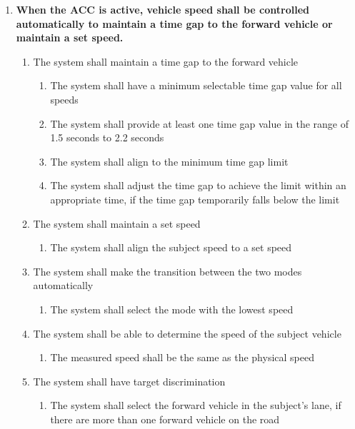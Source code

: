 \begin{enumerate}
    \item {\bf When the ACC is active, vehicle speed shall be controlled automatically to maintain a time gap to the forward vehicle or maintain a set speed.}
    \begin{enumerate}[label*=\arabic*]
        \item The system shall maintain a time gap to the forward vehicle
        \begin{enumerate}[label*=\arabic*]
            \item The system shall have a minimum selectable time gap value for all speeds
            \item The system shall provide at least one time gap value in the range of 1.5 seconds to 2.2 seconds
            \item The system shall align to the minimum time gap limit
            \item The system shall adjust the time gap to achieve the limit within an appropriate time, if the time gap temporarily falls below the limit
        \end{enumerate}
        \item The system shall maintain a set speed
        \begin{enumerate}[label*=\arabic*]
            \item The system shall align the subject speed to a set speed
        \end{enumerate}
        \item The system shall make the transition between the two modes automatically
        \begin{enumerate}[label*=\arabic*]
            \item{The system shall select the mode with the lowest speed}
        \end{enumerate}
        \item{The system shall be able to determine the speed of the subject vehicle}
        \begin{enumerate}[label*=\arabic*]
            \item{The measured speed shall be the same as the physical speed}
        \end{enumerate}
        \item{The system shall have target discrimination}
        \begin{enumerate}[label*=\arabic*]
            \item{The system shall select the forward vehicle in the subject’s lane, if there are more than one forward vehicle on the road}

\end{enumerate}
\end{enumerate}
\end{enumerate}
